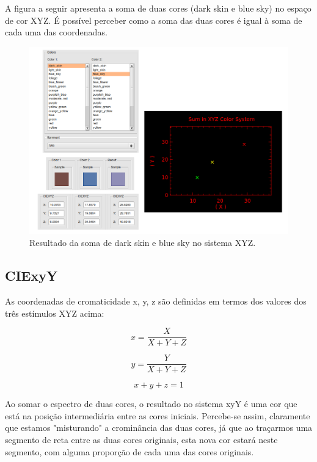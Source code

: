 \par
A figura a seguir apresenta a soma de duas cores (dark skin e blue sky) no
espaço de cor XYZ. É possível perceber como a soma das duas cores é igual à
soma de cada uma das coordenadas.

\begin{figure}[!htb]
     \centering
\includegraphics[scale=0.6]{img/XYZ_linearity_sample.png}
     \caption{Resultado da soma de dark skin e blue sky no sistema XYZ.}
     \label{fig:XYZ_linearity_sample}
\end{figure}

\subsection{CIExyY}
As coordenadas de cromaticidade x, y, z são definidas em termos dos valores
dos três estímulos XYZ acima:

\begin{equation}\label{eq:xyz_x}
x=\frac{X}{X+Y+Z}
\end{equation}

\begin{equation}\label{eq:xyz_y}
y=\frac{Y}{X+Y+Z}
\end{equation}

\begin{equation}\label{eq:xyz_z}
x+y+z=1
\end{equation}

\par
Ao somar o espectro de duas cores, o resultado no sistema xyY é uma cor que está
na posição intermediária entre as cores iniciais. Percebe-se assim, claramente
que estamos "misturando" a crominância das duas cores, já que ao traçarmos uma
segmento de reta entre as duas cores originais, esta nova cor estará neste
segmento, com alguma proporção de cada uma das cores originais.

